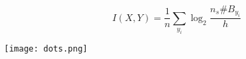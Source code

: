 \documentclass{beamer}
\title[A Kozachenko-Leonenko estimator]{}
\author{Conor Houghton}
\institute{CS, U Bristol}
\begin{document}
\begin{frame}
$$I(X,Y)=\frac{1}{n}\sum_{y_i}\log_2{\frac{n_s \#B_{y_i}}{h}}$$
\begin{center}
\texttt{[image: dots.png]}
\end{center}
\texttt{}
\end{frame}
\end{document}
